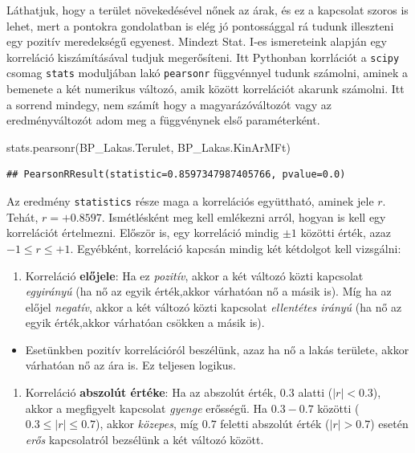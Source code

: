 \documentclass[
]{book}
\newenvironment{Shaded}{\begin{snugshade}}{\end{snugshade}}
\newcommand{\NormalTok}[1]{#1}
\providecommand{\tightlist}{%
  \setlength{\itemsep}{0pt}\setlength{\parskip}{0pt}}
\begin{document}
Láthatjuk, hogy a terület növekedésével nőnek az árak, és ez a kapcsolat szoros is lehet, mert a pontokra gondolatban is elég jó pontossággal rá tudunk illeszteni egy pozitív meredekségű egyenest.
Mindezt Stat. I-es ismereteink alapján egy korreláció kiszámításával tudjuk megerősíteni. Itt Pythonban korrlációt a \texttt{scipy} csomag \texttt{stats} moduljában lakó \texttt{pearsonr} függvénnyel tudunk számolni, aminek a bemenete a két numerikus változó, amik között korrelációt akarunk számolni. Itt a sorrend mindegy, nem számít hogy a magyarázóváltozót vagy az eredményváltozót adom meg a függvénynek első paraméterként.

\begin{Shaded}
\begin{Highlighting}[]
\NormalTok{stats.pearsonr(BP\_Lakas.Terulet, BP\_Lakas.KinArMFt)}
\end{Highlighting}
\end{Shaded}

\begin{verbatim}
## PearsonRResult(statistic=0.8597347987405766, pvalue=0.0)
\end{verbatim}

Az eredmény \texttt{statistics} része maga a korrelációs együttható, aminek jele \(r\). Tehát, \(r=+0.8597\). Ismétlésként meg kell emlékezni arról, hogyan is kell egy korrelációt értelmezni. Először is, egy korreláció mindig \(\pm1\) közötti érték, azaz \(-1\leq r \leq+1\). Egyébként, korreláció kapcsán mindig két kétdolgot kell vizsgálni:

\begin{enumerate}
\def\labelenumi{\arabic{enumi}.}
\tightlist
\item
  Korreláció \textbf{előjele}: Ha ez \emph{pozitív}, akkor a két változó közti kapcsolat \emph{egyirányú} (ha nő az egyik érték,akkor várhatóan nő a másik is). Míg ha az előjel \emph{negatív}, akkor a két változó közti kapcsolat \emph{ellentétes irányú} (ha nő az egyik érték,akkor várhatóan csökken a másik is).
\end{enumerate}

\begin{itemize}
\tightlist
\item
  Esetünkben pozitív korrelációról beszélünk, azaz ha nő a lakás területe, akkor várhatóan nő az ára is. Ez teljesen logikus.
\end{itemize}

\begin{enumerate}
\def\labelenumi{\arabic{enumi}.}
\setcounter{enumi}{1}
\tightlist
\item
  Korreláció \textbf{abszolút értéke}: Ha az abszolút érték, \(0.3\) alatti (\(|r|<0.3\)), akkor a megfigyelt kapcsolat \emph{gyenge} erősségű. Ha \(0.3-0.7\) közötti (\(0.3\leq|r|\leq0.7\)), akkor \emph{közepes}, míg \(0.7\) feletti abszolút érték (\(|r|>0.7\)) esetén \emph{erős} kapcsolatról bezsélünk a két változó között.
\end{enumerate}
\end{document}
